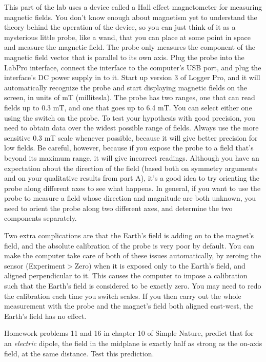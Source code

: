 This part of the lab uses a device called a Hall effect magnetometer for
measuring magnetic fields. You don't know enough about magnetism yet to 
understand the theory behind the operation of the device, so you can
just think of it as a mysterious little probe, like a wand, that you can place at some point
in space and measure the magnetic field. The probe only measures the component of the
magnetic field vector that is parallel to its own axis. Plug the probe into the
LabPro interface, connect the interface to the computer's USB port, and
plug the interface's DC power supply in to it. Start up version 3 of Logger Pro, and
it will automatically recognize the probe and start displaying magnetic fields
on the screen, in units of mT (millitesla). The probe has two ranges, one that can
read fields up to 0.3 mT, and one that goes up to 6.4 mT. You can select either one using the
switch on the probe. To test your hypothesis with good precision, you need to obtain
data over the widest possible range of fields. Always use the more sensitive 0.3 mT scale
whenever possible, because it will give better precision for low fields. Be careful,
however, because if you expose the probe to a field that's beyond its maximum range, it
will give incorrect readings. Although you have an expectation about the direction of the
field (based both on symmetry arguments and on your qualitative results from part A),
it's a good idea to try orienting the probe along different axes to see what happens.
In general, if you want to use the probe to measure a field whose direction and magnitude
are both unknown, you need to orient the probe along two different axes, and determine the
two components separately.

Two extra complications are that the Earth's field is adding on to the magnet's field, and the
absolute calibration of the probe is very poor by default.  
You can make the computer take care of both of these issues automatically, by zeroing the
sensor (Experiment$>$Zero) when it is exposed only to the Earth's field, and aligned perpendicular to it. This causes the
computer to impose a calibration such that the Earth's field is considered to be exactly zero. You may need
to redo the calibration each time you switch scales. If you then carry out the whole measurement with the
probe and the magnet's field both aligned east-west, the Earth's field has no effect.


Homework problems 11 and 16 in chapter 10 of Simple Nature, predict that for
an \emph{electric} dipole, the field in the midplane is exactly half as strong
as the on-axis field, at the same distance. Test this prediction.


